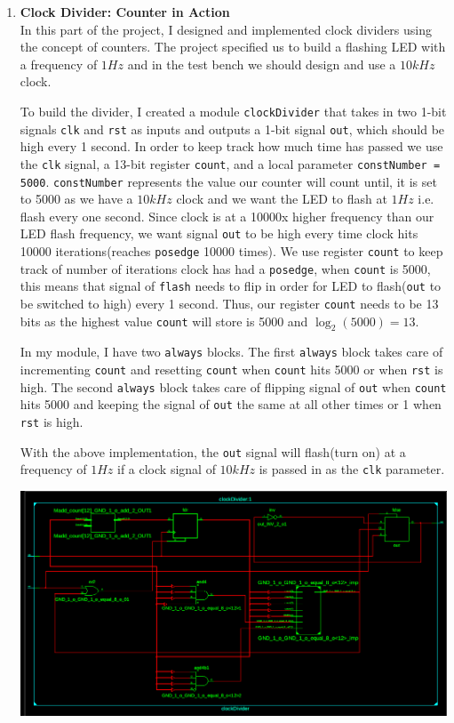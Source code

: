 \documentclass{article}
\begin{document}
\begin{enumerate}
    
    \item \textbf{Clock Divider: Counter in Action} \\
    In this part of the project, I designed and implemented clock dividers using the concept of counters. The project specified us to build a flashing LED with a frequency of $1Hz$ and in the test bench we should design and use a $10kHz$ clock. \par
    To build the divider, I created a module \texttt{clockDivider} that takes in two 1-bit signals \texttt{clk} and \texttt{rst} as inputs and outputs a 1-bit signal \texttt{out}, which should be high every 1 second. In order to keep track how much time has passed we use the \texttt{clk} signal, a 13-bit register \texttt{count}, and a local parameter \texttt{constNumber = 5000}. \texttt{constNumber} represents the value our counter will count until, it is set to 5000 as we have a $10kHz$ clock and we want the LED to flash at $1Hz$ i.e. flash every one second. Since clock is at a 10000x higher frequency than our LED flash frequency, we want signal \texttt{out} to be high every time clock hits 10000 iterations(reaches \texttt{posedge} 10000 times). We use register \texttt{count} to keep track of number of iterations clock has had a \texttt{posedge}, when \texttt{count} is 5000, this means that signal of \texttt{flash} needs to flip in order for LED to flash(\texttt{out} to be switched to high) every 1 second. Thus, our register \texttt{count} needs to be 13 bits as the highest value \texttt{count} will store is 5000 and $\log_{2}(5000)=13$.\par
    In my module, I have two \texttt{always} blocks. The first \texttt{always} block takes care of incrementing \texttt{count} and resetting \texttt{count} when \texttt{count} hits 5000 or when \texttt{rst} is high. The second \texttt{always} block takes care of flipping signal of \texttt{out} when \texttt{count} hits 5000 and keeping the signal of \texttt{out} the same at all other times or 1 when \texttt{rst} is high. \par
    With the above implementation, the \texttt{out} signal will flash(turn on) at a frequency of $1Hz$ if a clock signal of $10kHz$ is passed in as the \texttt{clk} parameter.
    \begin{center}
        \includegraphics[scale=0.29]{seqcircuitschema3.png} \\

\end{center}
\end{enumerate}
\end{document}
